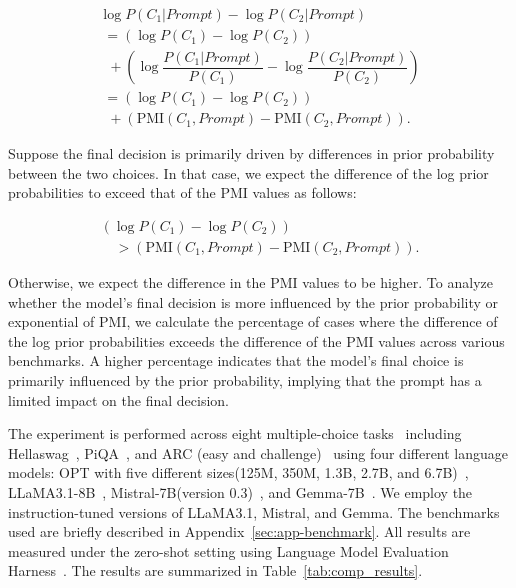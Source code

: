 \begin{small}
\[
\begin{array}{l}
\log{P(C_1|Prompt)} - \log{P(C_2|Prompt)} \\[5pt]
\; = (\log P(C_1) - \log P(C_2)) \\[5pt]
\; \; + \left(\log \dfrac{P(C_1|Prompt)}{P(C_1)} - \log \dfrac{P(C_2|Prompt)}{P(C_2)}\right)\\[10pt]
\; = (\log P(C_1) - \log P(C_2)) \\[5pt]
\; \;  + (\mbox{PMI}(C_1,Prompt) - \mbox{PMI}(C_2,Prompt)).
\end{array}
\]
\end{small}

Suppose the final decision is primarily driven by differences in prior probability between the two choices. In that case, we expect the difference of the log prior probabilities to exceed that of the PMI values as follows:

\begin{small}
\[
\begin{array}{l}
(\log{P(C_1)} - \log{P(C_2)})\\[5pt]
\quad > (\mbox{PMI}(C_1,Prompt) - \mbox{PMI}(C_2,Prompt)).
\end{array}
\]
\end{small}
Otherwise, we expect the difference in the PMI values to be higher. To analyze whether the model's final decision is more influenced by the prior probability or exponential of PMI, we calculate the percentage of cases where the difference of the log prior probabilities exceeds the difference of the PMI  values across various benchmarks. A higher percentage indicates that the model's final choice is primarily influenced by the prior probability, implying that the prompt has a limited impact on the final decision. 

The experiment is performed across eight multiple-choice tasks~\citep{welbl2017crowdsourcing, lai2017race, hendrycks2020measuring, liu2021logiqa} including Hellaswag~\citep{hellaswag}, PiQA~\citep{bisk2020piqa}, and ARC (easy and challenge)~\citep{clark2018think} using four different language models: OPT with five different sizes(125M, 350M, 1.3B, 2.7B, and 6.7B)~\citep{zhang2022opt}, LLaMA3.1-8B~\citep{dubey2024llama}, Mistral-7B(version 0.3)~\citep{jiang2024mixtral}, and Gemma-7B~\citep{team2024gemma}. We employ the instruction-tuned versions of LLaMA3.1, Mistral, and Gemma. The benchmarks used are briefly described in Appendix~\ref{sec:app-benchmark}. All results are measured under the zero-shot setting using Language Model Evaluation Harness~\citep{eval-harness}. The results are summarized in Table~\ref{tab:comp_results}. 

